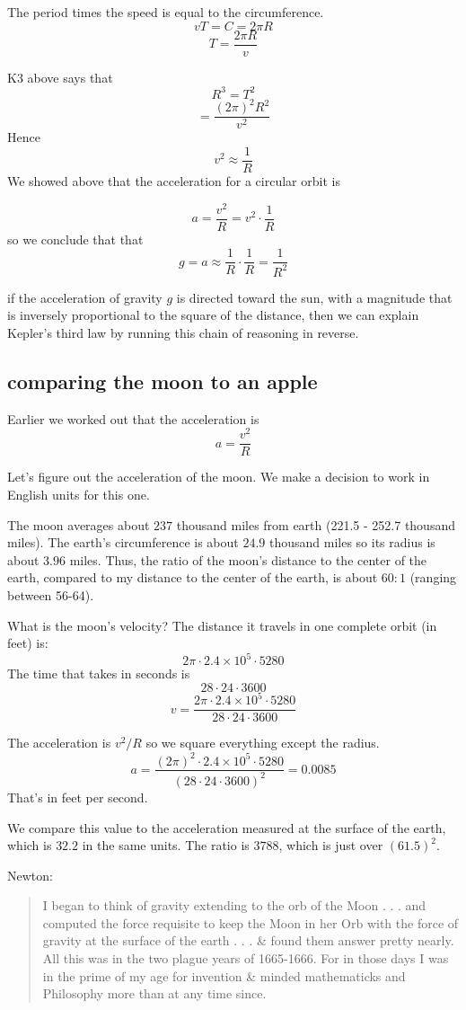 \documentclass[11pt, oneside]{article}
\begin{document}
The period times the speed is equal to the circumference.  
\[ vT = C = 2 \pi R \]
\[ T = \frac{2 \pi R}{v} \]

K3 above says that
\[ R^3 = T^2 \]
\[ = \frac{(2 \pi)^2 R^2}{v^2}  \]
Hence
\[ v^2 \approx \frac{1}{R} \]
We showed above that the acceleration for a circular orbit is

\[ a = \frac{v^2}{R} = v^2 \cdot \frac{1}{R}  \]
so we conclude that that
\[ g = a \approx \frac{1}{R} \cdot \frac{1}{R} = \frac{1}{R^2}  \] 

if the acceleration of gravity $g$ is directed toward the sun, with a magnitude that is inversely proportional to the square of the distance, then we can explain Kepler's third law by running this chain of reasoning in reverse.

\subsection*{comparing the moon to an apple}
Earlier we worked out that the acceleration is
\[ a = \frac{v^2}{R} \]

Let's figure out the acceleration of the moon.  We make a decision to work in English units for this one.  

The moon averages about $237$ thousand miles from earth (221.5 - 252.7 thousand miles).  The earth's circumference is about $24.9$ thousand miles so its radius is about $3.96$ miles.  Thus, the ratio of the moon's distance to the center of the earth, compared to my distance to the center of the earth, is about $60:1$ (ranging between 56-64).

What is the moon's velocity?  The distance it travels in one complete orbit (in feet) is:
\[ 2 \pi \cdot 2.4 \times 10^5 \cdot 5280 \]
The time that takes in seconds is 
\[ 28 \cdot 24 \cdot 3600 \]
\[ v = \frac{2 \pi \cdot 2.4 \times 10^5 \cdot 5280}{28 \cdot 24 \cdot 3600} \]

The acceleration is $v^2/R$ so we square everything except the radius.
\[ a = \frac{(2 \pi)^2 \cdot 2.4 \times 10^5 \cdot 5280}{(28 \cdot 24 \cdot 3600)^2} = 0.0085 \]
That's in feet per second.

We compare this value to the acceleration measured at the surface of the earth, which is $32.2$ in the same units.  The ratio is $3788$, which is just over $(61.5)^2$.

Newton:

\begin{quote}I began to think of gravity extending to the orb of the Moon . . . and computed the force requisite to keep the Moon in her Orb with the force of gravity at the surface of the earth . . . \& found them answer pretty nearly. All this was in the two plague years of 1665-1666. For in those days I was in the prime of my age for invention \& minded mathematicks and Philosophy more than at any time since.\end{quote}
\end{document}
